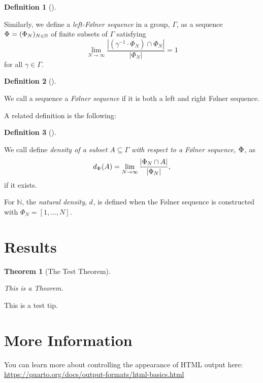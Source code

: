\documentclass[
  british,
]{article}
\theoremstyle{definition}
\newtheorem{definition}{Definition}[section]
\theoremstyle{plain}
\newtheorem{theorem}{Theorem}[section]
\theoremstyle{remark}
\newcommand{\Folner}[1][\vphantom{}]{{\Phi}_{#1}}
\newcommand{\GroupElement}{{\gamma}}
\newcommand{\Group}{{\Gamma}}
\newcommand{\Inverse}[1]{{#1}^{-1}}
\newcommand{\Density}[1][\Folner]{{d}_{#1}}
\newcommand{\N}{\mathbb{N}}
\begin{document}
\begin{definition}[]\protect\hypertarget{def-leftFolner}{}\label{def-leftFolner}

Similarly, we define a \emph{left-Følner sequence} in a group,
\(\Group\), as a sequence \(\Folner =(\Folner[N])_{N\in\mathbb{N}}\) of
finite subsets of \(\Gamma\) satisfying
\[\lim_{N\rightarrow\infty}\frac{|(\Inverse{\GroupElement}\cdot\Folner[N])\cap\Folner[N]|}{|\Folner[N]|}=1 \]for
all \(\GroupElement\in\Group\).

\end{definition}

\begin{definition}[]\protect\hypertarget{def-Folner}{}\label{def-Folner}

We call a sequence a \emph{Følner sequence} if it is both a left and
right Følner sequence.

\end{definition}

A related definition is the following:

\begin{definition}[]\protect\hypertarget{def-Density}{}\label{def-Density}

We call define \emph{density of a subset \(A\subseteq\Group\) with
respect to a Følner sequence, \(\Folner\),} as
\[\Density(A)=\lim_{N\rightarrow\infty}\frac{|\Folner[N]\cap A|}{|\Folner[N]|},\]
if it exists.

\end{definition}

For \(\N\), the \emph{natural density}, \(\Density[]\), is defined when
the Følner sequence is constructed with \(\Folner[N]=[1,...,N]\).

\section{Results}\label{results}

\begin{theorem}[The Test
Theorem]\protect\hypertarget{thm-Test}{}\label{thm-Test}

This is a Theorem.

\end{theorem}

\begin{tcolorbox}[enhanced jigsaw, colbacktitle=quarto-callout-tip-color!10!white, title=\textcolor{quarto-callout-tip-color}{\faLightbulb}\hspace{0.5em}{Tip}, rightrule=.15mm, opacitybacktitle=0.6, colframe=quarto-callout-tip-color-frame, opacityback=0, colback=white, coltitle=black, bottomrule=.15mm, leftrule=.75mm, breakable, left=2mm, arc=.35mm, toprule=.15mm, bottomtitle=1mm, toptitle=1mm, titlerule=0mm]

This is a test tip.

\end{tcolorbox}

\section{More Information}\label{more-information}

You can learn more about controlling the appearance of HTML output here:
\url{https://quarto.org/docs/output-formats/html-basics.html}
\end{document}
